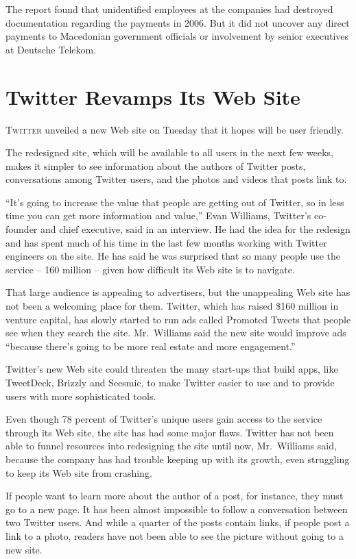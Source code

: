 ﻿\documentclass[12pt]{article}
\begin{document}
The report found that unidentified employees at the companies had destroyed documentation regarding
the payments in 2006. But it did not uncover any direct payments to Macedonian government officials
or involvement by senior executives at Deutsche Telekom.

\pagebreak
\section{Twitter Revamps Its Web Site}

\lettrine{T}{witter} unveiled a new Web site on Tuesday that it hopes will
be user friendly.

The redesigned site, which will be available to all users in the next few weeks, makes it simpler to
see information about the authors of Twitter posts, conversations among Twitter users, and the
photos and videos that posts link to.

``It's going to increase the value that people are getting out of Twitter, so in less time you can
get more information and value,'' Evan Williams, Twitter's co-founder and chief executive, said in
an interview. He had the idea for the redesign and has spent much of his time in the last few months
working with Twitter engineers on the site. He has said he was surprised that so many people use the
service -- 160 million -- given how difficult its Web site is to navigate.

That large audience is appealing to advertisers, but the unappealing Web site has not been a
welcoming place for them. Twitter, which has raised \$160 million in venture capital, has slowly
started to run ads called Promoted Tweets that people see when they search the site. Mr.~Williams
said the new site would improve ads ``because there's going to be more real estate and more
engagement.''

Twitter's new Web site could threaten the many start-ups that build apps, like TweetDeck, Brizzly
and Seesmic, to make Twitter easier to use and to provide users with more sophisticated tools.

Even though 78 percent of Twitter's unique users gain access to the service through its Web site,
the site has had some major flaws. Twitter has not been able to funnel resources into redesigning
the site until now, Mr.~Williams said, because the company has had trouble keeping up with its
growth, even struggling to keep its Web site from crashing.

If people want to learn more about the author of a post, for instance, they must go to a new page.
It has been almost impossible to follow a conversation between two Twitter users. And while a
quarter of the posts contain links, if people post a link to a photo, readers have not been able to
see the picture without going to a new site.
\end{document}

